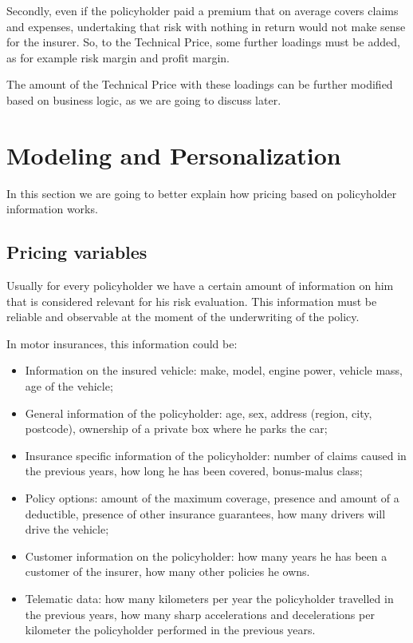\documentclass[a4paper, nobind]{templates/ociamthesis}
\providecommand{\tightlist}{%
  \setlength{\itemsep}{0pt}\setlength{\parskip}{0pt}}
\theoremstyle{definition}
\theoremstyle{definition}
\theoremstyle{definition}
\theoremstyle{remark}
\begin{document}
Secondly, even if the policyholder paid a premium that on average covers claims and expenses, undertaking that risk with nothing in return would not make sense for the insurer. So, to the Technical Price, some further loadings must be added, as for example risk margin and profit margin.

The amount of the Technical Price with these loadings can be further modified based on business logic, as we are going to discuss later.

\hypertarget{chap:personalization}{%
\section{Modeling and Personalization}\label{chap:personalization}}

In this section we are going to better explain how pricing based on policyholder information works.

\hypertarget{chap:pricing-variables}{%
\subsection{Pricing variables}\label{chap:pricing-variables}}

Usually for every policyholder we have a certain amount of information on him that is considered relevant for his risk evaluation. This information must be reliable and observable at the moment of the underwriting of the policy.

In motor insurances, this information could be:

\begin{itemize}
\tightlist
\item
  Information on the insured vehicle: make, model, engine power, vehicle mass, age of the vehicle;
\item
  General information of the policyholder: age, sex, address (region, city, postcode), ownership of a private box where he parks the car;
\item
  Insurance specific information of the policyholder: number of claims caused in the previous years, how long he has been covered, bonus-malus class;
\item
  Policy options: amount of the maximum coverage, presence and amount of a deductible, presence of other insurance guarantees, how many drivers will drive the vehicle;
\item
  Customer information on the policyholder: how many years he has been a customer of the insurer, how many other policies he owns.
\item
  Telematic data: how many kilometers per year the policyholder travelled in the previous years, how many sharp accelerations and decelerations per kilometer the policyholder performed in the previous years.
\end{itemize}
\end{document}
